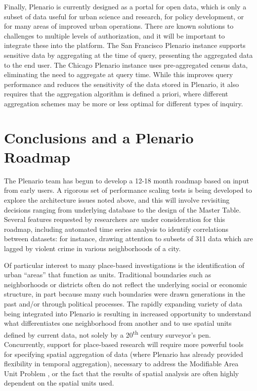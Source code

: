 \documentclass[11pt]{article}
\begin{document}
Finally, Plenario is currently designed as a portal for open data, which is only a subset of data useful for urban science and research, for policy development, or for many areas of improved urban operations. There are known solutions to challenges to multiple levels of authorization, and it will be important to integrate these into the platform. The San Francisco Plenario instance supports sensitive data by aggregating at the time of query, presenting the aggregated data to the end user. The Chicago Plenario instance uses pre-aggregated census data, eliminating the need to aggregate at query time. While this improves query performance and reduces the sensitivity of the data stored in Plenario, it also requires that the aggregation algorithm is defined a priori, where different aggregation schemes may be more or less optimal for different types of inquiry.

\section{Conclusions and a Plenario Roadmap}
The Plenario team has begun to develop a 12-18 month roadmap based on input from early users. A rigorous set of performance scaling tests is being developed to explore the architecture issues noted above, and this will involve revisiting decisions ranging from underlying database to the design of the Master Table. Several features requested by researchers are under consideration for this roadmap, including automated time series analysis to identify correlations between datasets: for instance, drawing attention to subsets of 311 data which are lagged by violent crime in various neighborhoods of a city. 

Of particular interest to many place-based investigations is the identification of urban ``areas'' that function as units. Traditional boundaries such as neighborhoods or districts often do not reflect the underlying social or economic structure, in part because many such boundaries were drawn generations in the past and/or through political processes. The rapidly expanding variety of data being integrated into Plenario is resulting in increased opportunity to understand what differentiates one neighborhood from another and to use spatial units defined by current data, not solely by a 20\textsuperscript{th} century surveyor's pen. Concurrently, support for place-based research will require more powerful tools for specifying spatial aggregation of data (where Plenario has already provided flexibility in temporal aggregation), necessary to address the Modifiable Area Unit Problem \cite{wong_2009}, or the fact that the results of spatial analysis are often highly dependent on the spatial units used.
\end{document}
